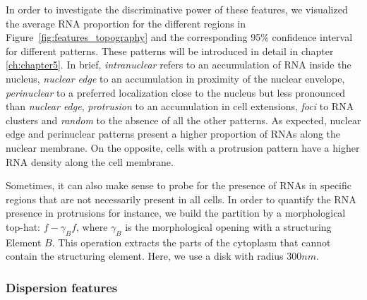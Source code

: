 In order to investigate the discriminative power of these features, we visualized the average \ac{RNA} proportion for the different regions in Figure~\ref{fig:features_topography} and the corresponding 95\% confidence interval
for different patterns. These patterns will be introduced in detail in chapter \ref{ch:chapter5}. In brief, \emph{intranuclear} refers to an accumulation of \ac{RNA} inside the nucleus, \emph{nuclear edge} to an accumulation in proximity of the nuclear envelope, \emph{perinuclear} to a preferred  localization close to the nucleus but less pronounced than \emph{nuclear edge}, \emph{protrusion} to an accumulation in cell extensions, \emph{foci} to \ac{RNA} clusters and \emph{random} to the absence of all the other patterns. 
As expected, nuclear edge and perinuclear patterns present a higher proportion of \ac{RNA}s along the nuclear membrane.
On the opposite, cells with a protrusion pattern have a higher \ac{RNA} density along the cell membrane. 


Sometimes, it can also make sense to probe for the presence of RNAs in specific regions that are not necessarily present in all cells. In order to quantify the RNA presence in protrusions for instance, we build the partition by a morphological top-hat: $f-\gamma_B f$, where $\gamma_B$ is the morphological opening with a structuring Element $B$. This operation extracts the parts of the cytoplasm that cannot contain the structuring element. Here, we use a disk with radius $300 nm$.   


\subsubsection{Dispersion features}

